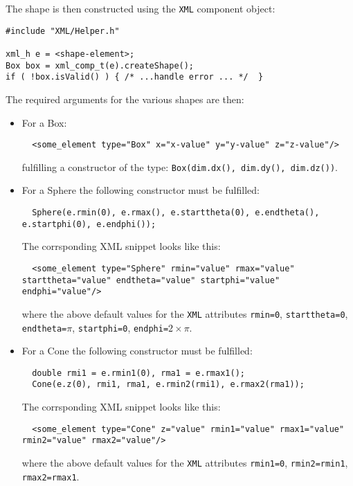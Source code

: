 The shape is then constructed using the \texttt{XML} component object:
\begin{verbatim}
#include "XML/Helper.h"

xml_h e = <shape-element>;
Box box = xml_comp_t(e).createShape();
if ( !box.isValid() ) { /* ...handle error ... */  }
\end{verbatim}
The required arguments for the various shapes are then:
\begin{itemize}
\item For a Box:
\begin{verbatim}
  <some_element type="Box" x="x-value" y="y-value" z="z-value"/>
\end{verbatim}
fulfilling a constructor of the type: \texttt{Box(dim.dx(), dim.dy(), dim.dz())}.

\item For a Sphere the following constructor must be fulfilled: 
\begin{verbatim}
  Sphere(e.rmin(0), e.rmax(), e.starttheta(0), e.endtheta(), e.startphi(0), e.endphi());
\end{verbatim}
The corrsponding XML snippet looks like this:
\begin{verbatim}
  <some_element type="Sphere" rmin="value" rmax="value" starttheta="value" endtheta="value" startphi="value" endphi="value"/>
\end{verbatim}
where the above default values for the \texttt{XML} attributes \texttt{rmin=0}, \texttt{starttheta=0}, \texttt{endtheta=$\pi$},
\texttt{startphi=0}, \texttt{endphi=$2\times\pi$}.

\item For a Cone the following constructor must be fulfilled: 
\begin{verbatim}
  double rmi1 = e.rmin1(0), rma1 = e.rmax1();
  Cone(e.z(0), rmi1, rma1, e.rmin2(rmi1), e.rmax2(rma1));
\end{verbatim}
The corrsponding XML snippet looks like this:
\begin{verbatim}
  <some_element type="Cone" z="value" rmin1="value" rmax1="value" rmin2="value" rmax2="value"/>
\end{verbatim}
where the above default values for the \texttt{XML} attributes \texttt{rmin1=0}, \texttt{rmin2=rmin1}, \texttt{rmax2=rmax1}.


\end{itemize}
